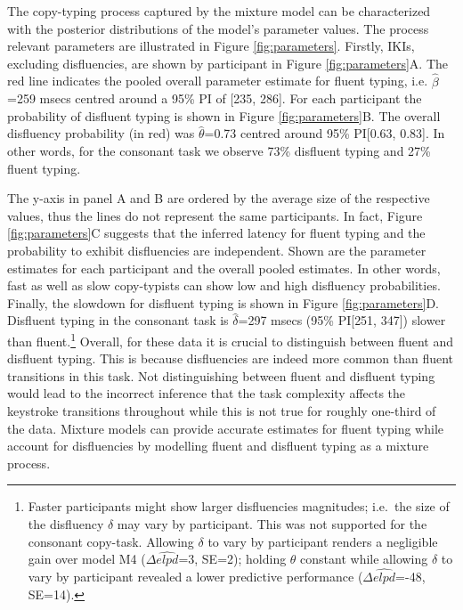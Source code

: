 \documentclass[english,man,floatsintext]{apa7}
\begin{document}
The copy-typing process captured by the mixture model can be characterized with the posterior distributions of the model's parameter values. The process relevant parameters are illustrated in Figure \ref{fig:parameters}. Firstly, IKIs, excluding disfluencies, are shown by participant in Figure \ref{fig:parameters}A. The red line indicates the pooled overall parameter estimate for fluent typing, i.e. \(\hat{\beta}\)=259 msecs centred around a 95\% PI of {[}235, 286{]}. For each participant the probability of disfluent typing is shown in Figure \ref{fig:parameters}B. The overall disfluency probability (in red) was \(\hat{\theta}\)=0.73 centred around 95\% PI{[}0.63, 0.83{]}. In other words, for the consonant task we observe 73\% disfluent typing and 27\% fluent typing.

The y-axis in panel A and B are ordered by the average size of the respective values, thus the lines do not represent the same participants. In fact, Figure \ref{fig:parameters}C suggests that the inferred latency for fluent typing and the probability to exhibit disfluencies are independent. Shown are the parameter estimates for each participant and the overall pooled estimates. In other words, fast as well as slow copy-typists can show low and high disfluency probabilities. Finally, the slowdown for disfluent typing is shown in Figure \ref{fig:parameters}D. Disfluent typing in the consonant task is \(\hat{\delta}\)=297 msecs (95\% PI{[}251, 347{]}) slower than fluent.\footnote{Faster participants might show larger disfluencies magnitudes; i.e.~the size of the disfluency \(\delta\) may vary by participant. This was not supported for the consonant copy-task. Allowing \(\delta\) to vary by participant renders a negligible gain over model M4 (\(\Delta\widehat{elpd}\)=3, SE=2); holding \(\theta\) constant while allowing \(\delta\) to vary by participant revealed a lower predictive performance (\(\Delta\widehat{elpd}\)=-48, SE=14).} Overall, for these data it is crucial to distinguish between fluent and disfluent typing. This is because disfluencies are indeed more common than fluent transitions in this task. Not distinguishing between fluent and disfluent typing would lead to the incorrect inference that the task complexity affects the keystroke transitions throughout while this is not true for roughly one-third of the data. Mixture models can provide accurate estimates for fluent typing while account for disfluencies by modelling fluent and disfluent typing as a mixture process.
\end{document}
